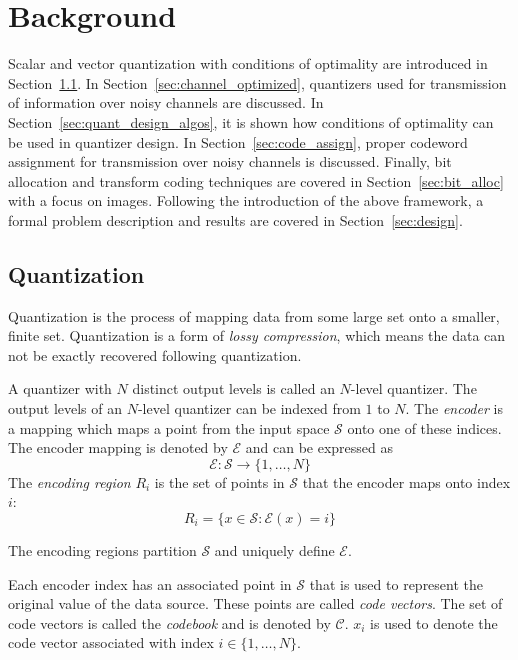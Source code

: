 \documentclass[10pt,twoside,titlepage]{article}
\begin{document}
\section{Background}
\label{sec:background}
Scalar and vector quantization with conditions of optimality are introduced in Section~\ref{sec:quantization}. In Section~\ref{sec:channel_optimized}, quantizers used for transmission of information over noisy channels are discussed. In Section~\ref{sec:quant_design_algos}, it is shown how conditions of optimality can be used in quantizer design. In Section~\ref{sec:code_assign}, proper codeword assignment for transmission over noisy channels is discussed. Finally, bit allocation and transform coding techniques are covered in Section~\ref{sec:bit_alloc} with a focus on images. Following the introduction of the above framework, a formal problem description and results are covered in Section~\ref{sec:design}.

\subsection{Quantization}
\label{sec:quantization}
Quantization is the process of mapping data from some large set onto a smaller, finite set. Quantization is a form of \emph{lossy compression}, which means the data can not be exactly recovered following quantization.

A quantizer with $N$ distinct output levels is called an $N$-level quantizer. The output levels of an $N$-level quantizer can be indexed from $1$ to $N$. The \emph{encoder} is a mapping which maps a point from the input space $\mathcal{S}$ onto one of these indices. The encoder mapping is denoted by $\mathcal{E}$ and can be expressed as
\begin{equation*}
\mathcal{E} : \mathcal{S} \rightarrow \{1,\ldots,N\}
\end{equation*}
The \emph{encoding region} $R_i$ is the set of points in $\mathcal{S}$ that the encoder maps onto index $i$:
\begin{equation*}
R_i = \{x \in \mathcal{S} : \mathcal{E}(x) = i\}
\end{equation*}

The encoding regions partition $\mathcal{S}$ and uniquely define $\mathcal{E}$.

Each encoder index has an associated point in $\mathcal{S}$ that is used to represent the original value of the data source. These points are called \emph{code vectors}. The set of code vectors is called the \emph{codebook} and is denoted by $\mathcal{C}$. $x_i$ is used to denote the code vector associated with index $i \in \{1,\ldots,N\}$.
\end{document}
